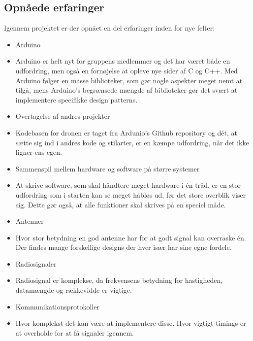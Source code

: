 \documentclass[Main]{subfiles}
\begin{document}
\subsection{Opnåede erfaringer}

Igennem projektet er der opnået en del erfaringer inden for nye felter:
\vspace{-20pt}
\begin{itemize}
\item Arduino
\item[] Arduino er helt nyt for gruppens medlemmer og det har været både en udfordring, men også en fornøjelse at opleve nye sider af C og C++.
Med Arduino følger en masse biblioteker, som gør nogle aspekter meget nemt at tilgå, mens Arduino's begrænsede mængde af biblioteker gør det svært at implementere specifikke design patterns.

\item Overtagelse af andres projekter
\item[] Kodebasen for dronen er taget fra Ardunio's Github repository og dét, at sætte sig ind i andres kode og stilarter, er en kæmpe udfordring, når det ikke ligner ens egen.


\item Sammenspil mellem hardware og software på større systemer
\item[] At skrive software, som skal håndtere meget hardware i én tråd, er en stor udfordring som i starten kan se meget håbløs ud, før det store overblik viser sig.
Dette gør også, at alle funktioner skal skrives på en speciel måde.

\item Antenner
\item[] Hvor stor betydning en god antenne har for at godt signal kan overraske én. Der findes mange forskellige designs der hver især har sine egne fordele.

\item Radiosignaler
\item[] Radiosignal er komplekse, da frekvensens betydning for hastigheden, datamængde og rækkevidde er vigtige.

\item Kommunikationsprotokoller
\item[] Hvor komplekst det kan være at implementere disse. Hvor vigtigt timings er at overholde for at få signaler igennem. 

\end{itemize}
\end{document}

